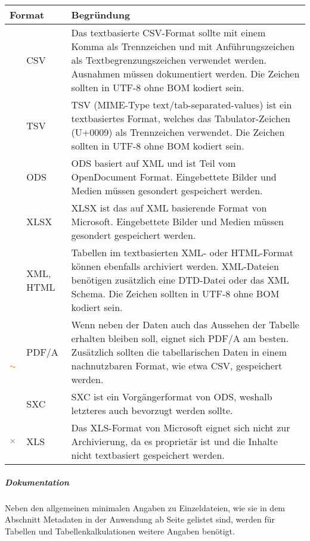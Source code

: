 \begin{center}
	\begin{tabular}{l p{} p{}}
		\toprule
		\multicolumn{2}{l}{Format} & Begründung \\ \midrule		
		\multirow{5}{*}{\color{ForestGreen} \LARGE \checkmark} & CSV & Das textbasierte CSV-Format sollte mit einem Komma als Trennzeichen und mit Anführungszeichen als Textbegrenzungszeichen verwendet werden. Ausnahmen müssen dokumentiert werden. Die Zeichen sollten in UTF-8 ohne BOM kodiert sein.\\
			& TSV & TSV (MIME-Type text/tab-separated-values) ist ein textbasiertes Format, welches das Tabulator-Zeichen (U+0009) als Trennzeichen verwendet. Die Zeichen sollten in UTF-8 ohne BOM kodiert sein.\\
		  & ODS & ODS basiert auf XML und ist Teil vom OpenDocument Format. Eingebettete Bilder und Medien müssen gesondert gespeichert werden.\\
		  & XLSX & XLSX ist das auf XML basierende Format von Microsoft. Eingebettete Bilder und Medien müssen gesondert gespeichert werden.\\ 
			& XML, HTML & Tabellen im textbasierten XML- oder HTML-Format können ebenfalls archiviert werden. XML-Dateien benötigen zusätzlich eine DTD-Datei oder das XML Schema. Die Zeichen sollten in UTF-8 ohne BOM kodiert sein.\\ \cmidrule(r){1-3}
		\multirow{2}{*}{$\color{BurntOrange} \thicksim$} & PDF/A & Wenn neben der Daten auch das Aussehen der Tabelle erhalten bleiben soll, eignet sich PDF/A am besten. Zusätzlich sollten die tabellarischen Daten in einem nachnutzbaren Format, wie etwa CSV, gespeichert werden.\\ 
			& SXC & SXC ist ein Vorgängerformat von ODS, weshalb letzteres auch bevorzugt werden sollte.\\ \cmidrule(r){1-3}
		\multirow{1}{*}{\LARGE \boldmath$\color{BrickRed} \times$}& XLS & Das XLS-Format von Microsoft eignet sich nicht zur Archivierung, da es proprietär ist und die Inhalte nicht textbasiert gespeichert werden.\\
		\bottomrule
		\bottomrule
	\end{tabular}
\end{center}

\subparagraph{Dokumentation} Neben den allgemeinen minimalen Angaben zu Einzeldateien, wie sie in dem Abschnitt Metadaten in der Anwendung ab Seite \pageref{Metadaten-anwendung} gelistet sind, werden für Tabellen und Tabellenkalkulationen weitere Angaben benötigt.

